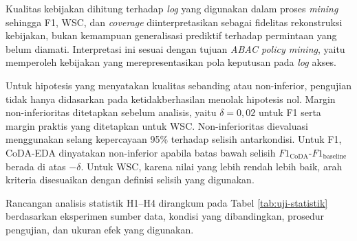 Kualitas kebijakan dihitung terhadap \textit{log} yang digunakan dalam proses \textit{mining} sehingga F1, WSC, dan \textit{coverage} diinterpretasikan sebagai fidelitas rekonstruksi kebijakan, bukan kemampuan generalisasi prediktif terhadap permintaan yang belum diamati. 
Interpretasi ini sesuai dengan tujuan \textit{ABAC policy mining}, yaitu memperoleh kebijakan yang merepresentasikan pola keputusan pada \textit{log} akses.

Untuk hipotesis yang menyatakan kualitas sebanding atau non-inferior, pengujian tidak hanya didasarkan pada ketidakberhasilan menolak hipotesis nol. 
Margin non-inferioritas ditetapkan sebelum analisis, yaitu $\delta=0{,}02$ untuk F1 serta margin praktis yang ditetapkan untuk WSC. 
Non-inferioritas dievaluasi menggunakan selang kepercayaan 95\% terhadap selisih antarkondisi. 
Untuk F1, CoDA-EDA dinyatakan non-inferior apabila batas bawah selisih $F1_{\text{CoDA}}$-$F1_{\text{baseline}}$ berada di atas $-\delta$. 
Untuk WSC, karena nilai yang lebih rendah lebih baik, arah kriteria disesuaikan dengan definisi selisih yang digunakan.

Rancangan analisis statistik H1–H4 dirangkum pada Tabel \ref{tab:uji-statistik} berdasarkan eksperimen sumber data, kondisi yang dibandingkan, prosedur pengujian, dan ukuran efek yang digunakan.

